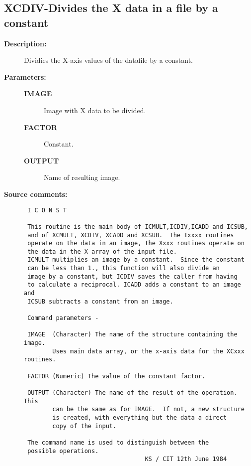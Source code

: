 \subsection{XCDIV-\label{XCDIV}Divides the X data in a file by a constant}
\begin{description}

\item [{\bf Description:}]
 Dividies the X-axis values of the datafile by a constant.

\item [{\bf Parameters:}]
\begin{description}
\item [{\bf IMAGE}]
 Image with X data to be divided.
\item [{\bf FACTOR}]
 Constant.
\item [{\bf OUTPUT}]
 Name of resulting image.
\end{description}

\item [{\bf Source comments:}]
\begin{verbatim}
 I C O N S T

 This routine is the main body of ICMULT,ICDIV,ICADD and ICSUB,
 and of XCMULT, XCDIV, XCADD and XCSUB.  The Ixxxx routines
 operate on the data in an image, the Xxxx routines operate on
 the data in the X array of the input file.
 ICMULT multiplies an image by a constant.  Since the constant
 can be less than 1., this function will also divide an
 image by a constant, but ICDIV saves the caller from having
 to calculate a reciprocal. ICADD adds a constant to an image and
 ICSUB subtracts a constant from an image.

 Command parameters -

 IMAGE  (Character) The name of the structure containing the image.
        Uses main data array, or the x-axis data for the XCxxx routines.

 FACTOR (Numeric) The value of the constant factor.

 OUTPUT (Character) The name of the result of the operation.  This
        can be the same as for IMAGE.  If not, a new structure
        is created, with everything but the data a direct
        copy of the input.

 The command name is used to distinguish between the
 possible operations.
                                  KS / CIT 12th June 1984
\end{verbatim}
\end{description}
